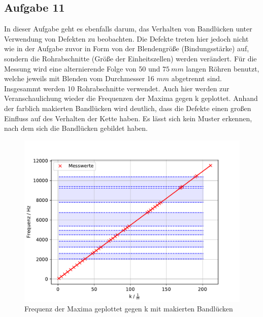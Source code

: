 \subsection{Aufgabe 11}
In dieser Aufgabe geht es ebenfalls darum, das Verhalten von Bandlücken unter Verwendung von Defekten zu beobachten.
Die Defekte treten hier jedoch nicht wie in der Aufgabe zuvor in Form von der Blendengröße (Bindungsstärke) auf, sondern die Rohrabschnitte (Größe der Einheitszellen) werden verändert.
Für die Messung wird eine alternierende Folge von 50 und $\SI{75}{mm}$ langen Röhren benutzt, welche jeweils mit Blenden vom Durchmesser 16 $\si{mm}$ abgetrennt sind.
Insgesammt werden 10 Rohrabschnitte verwendet.
Auch hier werden zur Veranschaulichung wieder die Frequenzen der Maxima gegen k geplottet.
Anhand der farblich makierten Bandlücken wird deutlich, dass die Defekte einen großen Einfluss auf des Verhalten der Kette haben.
Es lässt sich kein Muster erkennen, nach dem sich die Bandlücken gebildet haben.
\begin{figure}[h!]
  \centering
  \includegraphics[width=1\textwidth]{A112.pdf}
  \caption{Frequenz der Maxima geplottet gegen k mit makierten Bandlücken}
  \label{fig.Aufgabe111}
\end{figure}
\FloatBarrier

